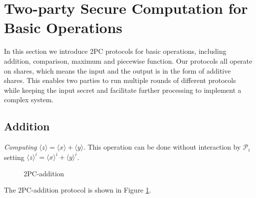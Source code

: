 \documentclass[letterpaper]{article} %
\begin{document}
\section{Two-party Secure Computation for Basic Operations}

    In this section we introduce 2PC protocols for basic operations,
    including addition, comparison, maximum and piecewise function.
    Our protocols all operate on shares, which means
    the input and the output is in the form of additive shares.
    This enables two parties to run multiple rounds of different
    protocols while keeping the input secret
    and facilitate further processing to implement a complex system.


    \subsection{Addition}

    \emph{Computing} $ \langle z\rangle  = \langle x\rangle  + \langle y\rangle $. This operation can be done without interaction by
    $\mathcal{P}_{i}$ setting $\langle z\rangle^{i}  = \langle x\rangle^{i}  + \langle y\rangle^{i} $.

    \begin{figure}[ht]
        \caption{2PC-addition}
        \label{2PC-addition}
    \end{figure}
    The 2PC-addition protocol is shown in Figure \ref{2PC-addition}.
\end{document}
